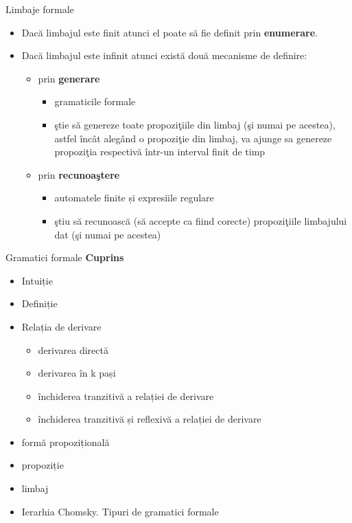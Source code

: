 \documentclass[pdf]{beamer}
\begin{document}
\begin{frame}{Limbaje formale}
\begin{itemize}
\item
Dacă limbajul este finit atunci el poate să fie definit prin \textbf{enumerare}. 
\item
Dacă limbajul este infinit atunci există două mecanisme de definire: 
\begin{itemize}
\item
prin \textbf{generare} 
\begin{itemize}
\item
gramaticile formale
\item
ştie să genereze toate propoziţiile din limbaj (şi numai pe acestea), astfel încât alegând o propoziţie din limbaj, va ajunge sa genereze propoziţia respectivă într-un interval finit de timp
\end{itemize}
\item
prin \textbf{recunoaştere}
\begin{itemize}
\item
automatele finite și expresiile regulare
\item
ştiu să recunoască (să accepte ca fiind corecte) propoziţiile limbajului dat (şi numai pe acestea)
\end{itemize}
\end{itemize}
\end{itemize}
\end{frame}



\begin{frame}{Gramatici formale}
\textbf{Cuprins}
\begin{itemize}
\item
Intuiție
\item
Definiție
\item
Relația de derivare
\begin{itemize}
\item
derivarea directă
\item
derivarea în k pași
\item
închiderea tranzitivă a relației de derivare
\item
închiderea tranzitivă și reflexivă a relației de derivare
\end{itemize}
\item
formă propozițională
\item
propoziție
\item
limbaj
\item
Ierarhia Chomsky. Tipuri de gramatici formale
\end{itemize}
\end{frame}
\end{document}
